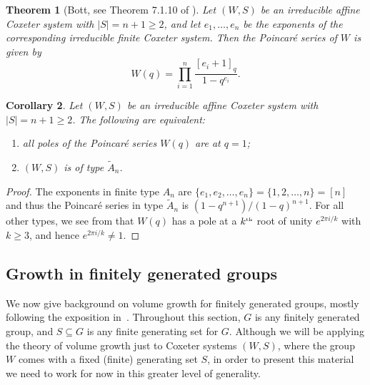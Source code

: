 \documentclass[11pt]{amsart}
\theoremstyle{plain}
\newtheorem{thm}{Theorem}[section]
\newtheorem{corollary}[thm]{Corollary}
\theoremstyle{definition}
\numberwithin{equation}{subsection}
\begin{document}
\begin{thm}[Bott, see Theorem 7.1.10 of \cite{BjoernerBrenti}]\label{thm:Bott} Let $(W,S)$ be an irreducible affine Coxeter system with $|S| = n+1 \geq 2$,  and let $e_1,\dots,e_n$ be the exponents of the corresponding irreducible finite Coxeter system. Then the Poincar\'e series of $W$ is given by 
\[
W(q) = \prod_{i=1}^n \frac{[e_i + 1]_q}{1 - q^{e_i}}.
\]
\end{thm}

\begin{corollary}\label{cor:affinePoles} Let $(W,S)$ be an irreducible affine Coxeter system with $|S| = n+1 \geq 2$. The following are equivalent:
\begin{enumerate}
\item all poles of the Poincar\'e series $W(q)$ are at $q = 1$;
\item $(W,S)$ is of type $\tilde{A}_n$.
\end{enumerate}
\end{corollary}

\begin{proof} The exponents in finite type $A_n$ are
$
	\{ e_1,e_2,\ldots,e_n \} = \{ 1,2,\ldots,n \} = [n]
$
and thus the Poincar\'e series in type $\tilde{A}_n$ is $(1-q^{n+1})/(1-q)^{n+1}$. For all other types, we see from \cite[Table I, Appendix A1]{BjoernerBrenti} that $W(q)$ has a pole at a $k^{\mbox{\tiny{th}}}$ root of unity $e^{2\pi i/k}$ with $k \geq 3$, and hence $e^{2\pi i/k} \neq 1$. 
\end{proof}





\subsection{Growth in finitely generated groups}\label{sec:growth}

We now give background on volume growth for finitely generated groups, mostly following the exposition in~\cite[Chapter~6]{Loeh}. Throughout this section, $G$ is any finitely generated group, and $S \subseteq G$ is any finite generating set for $G$. Although we will be applying the theory of volume growth just to Coxeter systems $(W,S)$, where the group $W$ comes with a fixed (finite) generating set $S$, in order to present this material we need to work for now in this greater level of generality.
\end{document}
